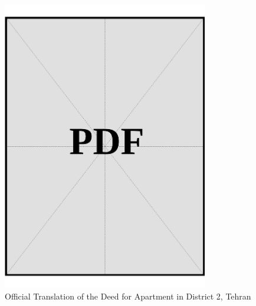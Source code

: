 \vspace*{\fill}
\begin{figure}[h]
    \centering
    \includegraphics[page=1, width=0.8\textwidth]{../application-docs/sponsor/funds/property-deeds/property-2/official-translations.pdf}
    \caption{Official Translation of the Deed for Apartment in District 2, Tehran}
    \label{fig:sponsor-apartment-dist2-tehran-official-translation}
\end{figure}
\vspace*{\fill}

\clearpage


